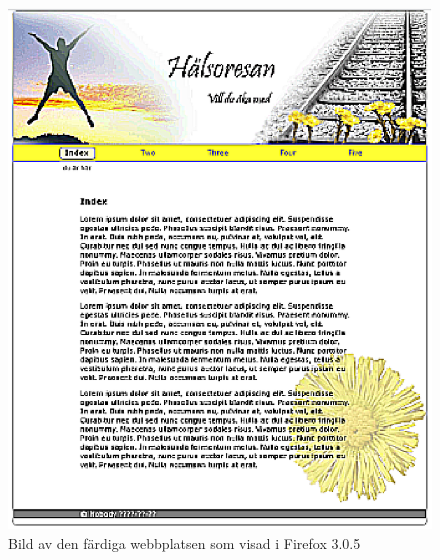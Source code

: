 \documentclass[a4paper,10pt]{article}
\begin{document}
\begin{figure}[h]
 \begin{center}
  \includegraphics{complete.eps}
 \end{center}
 \caption{Bild av den färdiga webbplatsen som visad i Firefox 3.0.5}
 \label{complete}
\end{figure}
\end{document}
